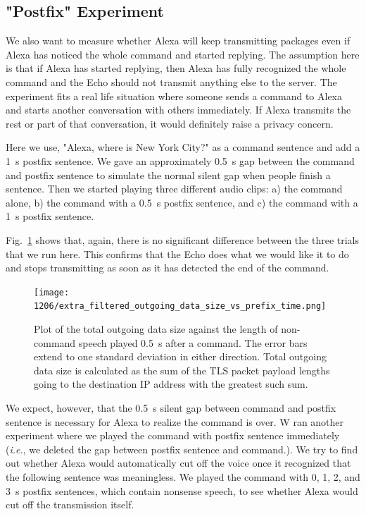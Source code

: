 \subsection{"Postfix" Experiment}
  
We also want to measure whether Alexa will keep transmitting packages even if Alexa has noticed the whole command and started replying. The assumption here is that if Alexa has started replying, then Alexa has fully recognized the whole command and the Echo should not transmit anything else to the server. The experiment fits a real life situation where someone sends a command to Alexa and starts another conversation with others immediately. If Alexa transmits the rest or part of that conversation, it would definitely raise a privacy concern.

Here we use, "Alexa, where is New York City?" as a command sentence and add a 1~s postfix sentence. We gave an approximately 0.5~s gap between the command and postfix sentence to simulate the normal silent gap when people finish a sentence. Then we started playing three different audio clips: a) the command alone, b) the command with a 0.5~s postfix sentence, and c) the command with a 1~s postfix sentence.

Fig.~\ref{fig:postfix_gap} shows that, again, there is no significant difference between the three trials that we run here. This confirms that the Echo does what we would like it to do and stops transmitting as soon as it has detected the end of the command.

\begin{figure}[!t]
    \centering
    \texttt{[image: 1206/extra\_filtered\_outgoing\_data\_size\_vs\_prefix\_time.png]}
    \caption{Plot of the total outgoing data size against the length of non-command speech played 0.5~s after a command. The error bars extend to one standard deviation in either direction. Total outgoing data size is calculated as the sum of the TLS packet payload lengths going to the destination IP address with the greatest such sum.}
    \label{fig:postfix_gap}
\end{figure}



We expect, however, that the 0.5~s silent gap between command and postfix sentence is necessary for Alexa to realize the command is over. W ran another experiment where we played the command with postfix sentence immediately (\textit{i.e.}, we deleted the gap between postfix sentence and command.). We try to find out whether Alexa would automatically cut off the voice once it recognized that the following sentence was meaningless. We played the command with 0, 1, 2, and 3~s postfix sentences, which contain nonsense speech, to see whether Alexa would cut off the transmission itself.

